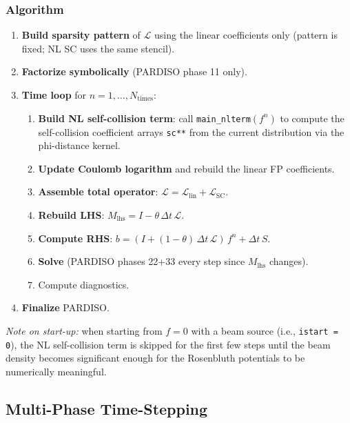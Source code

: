 \documentclass[11pt,a4paper]{article}
\newcommand{\dt}{\Delta t}
\newcommand{\Lcal}{\mathcal{L}}
\begin{document}
\subsubsection{Algorithm}

\begin{enumerate}
  \item \textbf{Build sparsity pattern} of $\Lcal$ using the linear
        coefficients only (pattern is fixed; NL SC uses the same stencil).
  \item \textbf{Factorize symbolically} (PARDISO phase 11 only).
  \item \textbf{Time loop} for $n = 1, \ldots, N_\mathrm{times}$:
        \begin{enumerate}
          \item \textbf{Build NL self-collision term}: call
                \texttt{main\_nlterm}$(f^n)$ to compute the self-collision
                coefficient arrays \texttt{sc**} from the current distribution
                via the phi-distance kernel.
          \item \textbf{Update Coulomb logarithm} and rebuild the linear FP
                coefficients.
          \item \textbf{Assemble total operator}: $\Lcal = \Lcal_\mathrm{lin} + \Lcal_\mathrm{SC}$.
          \item \textbf{Rebuild LHS}: $M_\mathrm{lhs} = I - \theta\,\dt\,\Lcal$.
          \item \textbf{Compute RHS}:
                $b = (I+(1-\theta)\,\dt\,\Lcal)\,f^n + \dt\,S$.
          \item \textbf{Solve} (PARDISO phases 22+33 every step since $M_\mathrm{lhs}$ changes).
          \item Compute diagnostics.
        \end{enumerate}
  \item \textbf{Finalize} PARDISO.
\end{enumerate}

\textit{Note on start-up:} when starting from $f = 0$ with a beam source
(i.e., \texttt{istart = 0}), the NL self-collision term is skipped for the
first few steps until the beam density becomes significant enough for the
Rosenbluth potentials to be numerically meaningful.

\subsection{Multi-Phase Time-Stepping}
\end{document}
